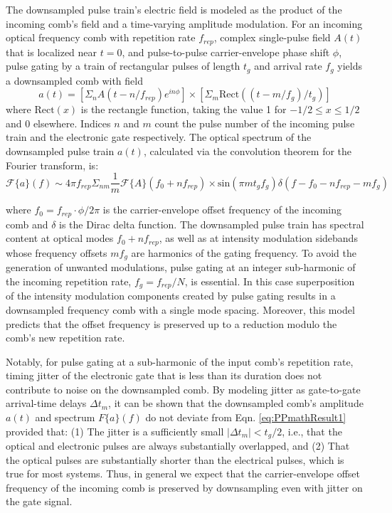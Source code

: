 The downsampled pulse train's electric field is modeled as the product of the incoming comb's field and a time-varying amplitude modulation. For an incoming optical frequency comb with repetition rate $f_{rep}$, complex single-pulse field $A(t)$ that is localized near $t=0$, and pulse-to-pulse carrier-envelope phase shift $\phi$, pulse gating by a train of rectangular pulses of length $t_g$ and arrival rate $f_g$  yields a downsampled comb with field
\begin{equation}
a(t)=\left[\Sigma_n A(t-n/f_{rep}) e^{in\phi}\right]\times\left[\Sigma_m \mathrm{Rect}\left((t-m/f_g)/t_g \right)\right]  \label{eq:PPmathResult1}
\end{equation}                                            
where $\mathrm{Rect}(x)$ is the rectangle function, taking the value 1 for $-1/2\leq x\leq 1/2$ and 0 elsewhere. Indices $n$ and $m$ count the pulse number of the incoming pulse train and the electronic gate respectively. The optical spectrum of the downsampled pulse train $a(t)$, calculated via the convolution theorem for the Fourier transform, is:
\begin{equation}
\mathcal{F}\{a\}(f)\sim 4\pi f_{rep} \Sigma_{nm}\frac{1}{m}\mathcal{F}\{A\}(f_0+nf_{rep})\times\mathrm{sin}(\pi m t_g f_g)\delta(f-f_0-nf_{rep}-mf_g )
\end{equation}
                                    
where $f_0=f_{rep}\cdot\phi/2\pi$ is the carrier-envelope offset frequency of the incoming comb and $\delta$ is the Dirac delta function.  The downsampled pulse train has spectral content at optical modes $f_0+nf_{rep}$, as well as at intensity modulation sidebands whose frequency offsets $mf_g$ are harmonics of the gating frequency. To avoid the generation of unwanted modulations, pulse gating at an integer sub-harmonic of the incoming repetition rate, $f_g=f_{rep}/N$, is essential. In this case superposition of the intensity modulation components created by pulse gating results in a downsampled frequency comb with a single mode spacing. Moreover, this model predicts that the offset frequency is preserved up to a reduction modulo the comb's new repetition rate. 

Notably, for pulse gating at a sub-harmonic of the input comb's repetition rate, timing jitter of the electronic gate that is less than its duration does not contribute to noise on the downsampled comb. By modeling jitter as gate-to-gate arrival-time delays $\Delta t_m$, it can be shown that the downsampled comb's amplitude $a(t)$ and spectrum $F\{a\}(f)$ do not deviate from Eqn. \ref{eq:PPmathResult1} provided that: (1) The jitter is a sufficiently small $|\Delta t_m |<t_g/2$, i.e., that the optical and electronic pulses are always substantially overlapped, and (2) That the optical pulses are substantially shorter than the electrical pulses, which is true for most systems. Thus, in general we expect that the carrier-envelope offset frequency of the incoming comb is preserved by downsampling even with jitter on the gate signal. 

